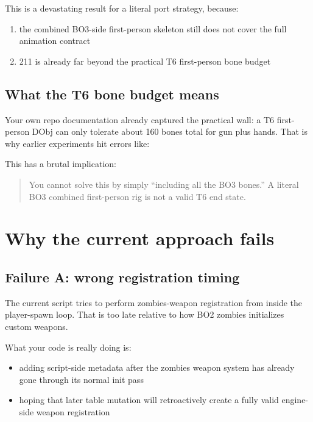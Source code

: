 \documentclass[11pt]{article}
\begin{document}
This is a devastating result for a literal port strategy, because:

\begin{enumerate}
  \item the combined BO3-side first-person skeleton still does not cover the full animation contract
  \item 211 is already far beyond the practical T6 first-person bone budget
\end{enumerate}

\subsection{What the T6 bone budget means}

Your own repo documentation already captured the practical wall: a T6 first-person DObj can only tolerate about 160 bones total for gun plus hands. That is why earlier experiments hit errors like:

\begin{quote}
\end{quote}

This has a brutal implication:

\begin{quote}
You cannot solve this by simply ``including all the BO3 bones.'' A literal BO3 combined first-person rig is not a valid T6 end state.
\end{quote}

\section{Why the current approach fails}

\subsection{Failure A: wrong registration timing}

The current script tries to perform zombies-weapon registration from inside the player-spawn loop. That is too late relative to how BO2 zombies initializes custom weapons.

What your code is really doing is:

\begin{itemize}
  \item adding script-side metadata after the zombies weapon system has already gone through its normal init pass
  \item hoping that later table mutation will retroactively create a fully valid engine-side weapon registration
\end{itemize}
\end{document}
